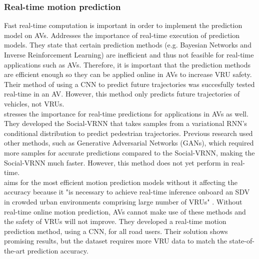\subsubsection{Real-time motion prediction}
Fast real-time computation is important in order to implement the prediction model on AVs. 
\cite{djuric2020uncertainty} Addresses the importance of real-time execution of prediction models. They state that certain prediction methods (e.g. Bayesian Networks and Inverse Reinforcement Learning) are inefficient and thus not feasible for real-time applications such as AVs. Therefore, it is important that the prediction methods are efficient enough so they can be applied online in AVs to increase VRU safety. Their method of using a CNN to predict future trajectories was succesfully tested real-time in an AV. However, this method only predicts future trajectories of vehicles, not VRUs. \\
\cite{brito2020social} stresses the importance for real-time predictions for applications in AVs as well. They developed the Social-VRNN that takes samples from a variational RNN's conditional distribution to predict pedestrian trajectories. Previous research used other methods, such as Generative Adversarial Networks (GANs), which required more samples for accurate predictions compared to the Social-VRNN, making the Social-VRNN much faster. However, this method does not yet perform in real-time.  \\
\cite{chou2020predicting} aims for the most efficient motion prediction models without it affecting the accuracy because it "is necessary to achieve real-time inference onboard an SDV in crowded urban environments comprising large number of VRUs" \cite{chou2020predicting}. Without real-time online motion prediction, AVs cannot make use of these methods and the safety of VRUs will not improve. They developed a real-time motion prediction method, using a CNN, for all road users. Their solution shows promising results, but the dataset requires more VRU data to match the state-of-the-art prediction accuracy. 

